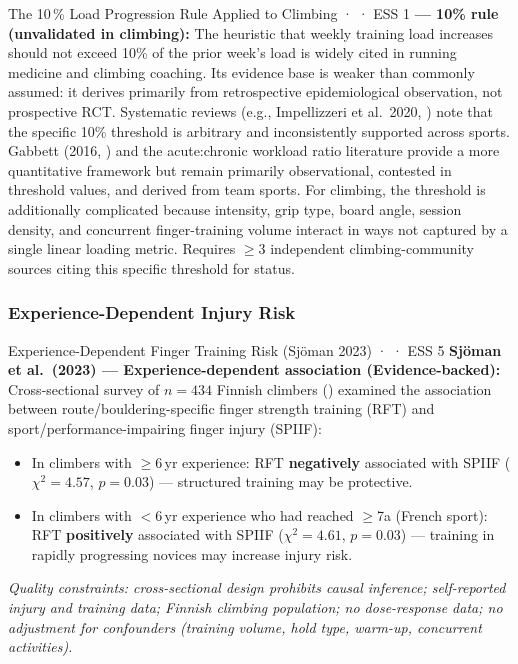\begin{toverifybox}{The 10\,\% Load Progression Rule Applied to Climbing · \toverify · ESS 1}
\textbf{\toverify --- 10\% rule (unvalidated in climbing):} The heuristic that weekly training load increases should not exceed 10\% of the prior week's load is widely cited in running medicine and climbing coaching. Its evidence base is weaker than commonly assumed: it derives primarily from retrospective epidemiological observation, not prospective RCT. Systematic reviews (e.g., Impellizzeri et al.\ 2020, \cite{IWC+20}) note that the specific 10\% threshold is arbitrary and inconsistently supported across sports. Gabbett (2016, \cite{Gab16}) and the acute:chronic workload ratio literature provide a more quantitative framework but remain primarily observational, contested in threshold values, and derived from team sports. For climbing, the threshold is additionally complicated because intensity, grip type, board angle, session density, and concurrent finger-training volume interact in ways not captured by a single linear loading metric. Requires $\geq$3 independent climbing-community sources citing this specific threshold for \folkloreverified status.
\end{toverifybox}

\subsubsection{Experience-Dependent Injury Risk}

\begin{evidencebox}{Experience-Dependent Finger Training Risk (Sjöman 2023) · \evidencebacked · ESS 5}
\textbf{Sjöman et al.\ (2023) --- Experience-dependent association (Evidence-backed):} Cross-sectional survey of $n=434$ Finnish climbers (\cite{SGJ23}) examined the association between route/bouldering-specific finger strength training (RFT) and sport/performance-impairing finger injury (SPIIF):
\begin{itemize}[leftmargin=1.5em,noitemsep]
  \item In climbers with $\geq$6\,yr experience: RFT \textbf{negatively} associated with SPIIF ($\chi^2=4.57$, $p=0.03$) --- structured training may be protective.
  \item In climbers with $<$6\,yr experience who had reached $\geq$7a (French sport): RFT \textbf{positively} associated with SPIIF ($\chi^2=4.61$, $p=0.03$) --- training in rapidly progressing novices may increase injury risk.
\end{itemize}
\textit{Quality constraints: cross-sectional design prohibits causal inference; self-reported injury and training data; Finnish climbing population; no dose-response data; no adjustment for confounders (training volume, hold type, warm-up, concurrent activities).}
\end{evidencebox}

